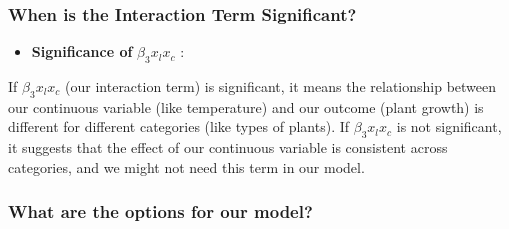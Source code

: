 \documentclass[
  letterpaper,
  DIV=11,
  numbers=noendperiod]{scrreprt}
\providecommand{\tightlist}{%
  \setlength{\itemsep}{0pt}\setlength{\parskip}{0pt}}\usepackage{longtable,booktabs,array}
\begin{document}
\subsubsection{When is the Interaction Term
Significant?}\label{when-is-the-interaction-term-significant}

\begin{itemize}
\tightlist
\item
  \textbf{Significance of} \(\beta_3x_lx_c\) :
\end{itemize}

If \(\beta_3x_lx_c\) (our interaction term) is significant, it means the
relationship between our continuous variable (like temperature) and our
outcome (plant growth) is different for different categories (like types
of plants). If \(\beta_3x_lx_c\) is not significant, it suggests that
the effect of our continuous variable is consistent across categories,
and we might not need this term in our model.

\subsubsection{What are the options for our
model?}\label{what-are-the-options-for-our-model}
\end{document}
